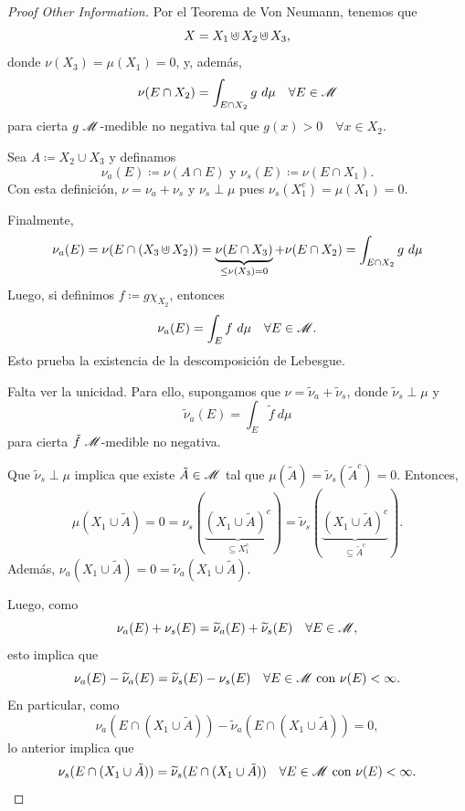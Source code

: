 
\begin{proof}[Proof Other Information]
	Por el Teorema de Von Neumann, tenemos que 
	\[ X = X_{1} \cupd X_{2} \cupd X_{3}, \]
	donde $\nu(X_{3}) = \mu(X_{1}) = 0$, y, además, 
	\[ \nu(E \cap X_{2}) = \int_{E \cap X_{2}} g \ d\mu \quad \forall E \in \mathscr{M} \]
	para cierta $g \ \mathscr{M}$-medible no negativa tal que $g(x) > 0 \quad \forall x \in X_{2}$. \par
	Sea $A \coloneq X_{2} \cup X_{3}$ y definamos
	\[ \nu_{a}(E) \coloneq \nu(A \cap E) \text{ y } \nu_{s}(E) \coloneq \nu(E \cap X_{1}). \]
	Con esta definición, $\nu = \nu_{a} + \nu_{s}$ y $\nu_{s} \perp \mu$ pues $\nu_{s}(X_{1}^{c}) = \mu(X_{1}) = 0$. \par
	Finalmente,
	\[ \nu_{a}(E) = \nu(E \cap (X_{3} \cupd X_{2})) = \underbrace{\nu(E \cap X_{3})}_{\leq \nu(X_{3}) = 0} + \nu(E \cap X_{2}) = \int_{E \cap X_{2}} g \ d\mu \]
	Luego, si definimos $f \coloneq g \chi_{X_{2}}$, entonces
	\[ \nu_{a}(E) = \int_{E} f \ d\mu \quad \forall E \in \mathscr{M}. \]
	Esto prueba la existencia de la descomposición de Lebesgue. \par
	Falta ver la unicidad. Para ello, supongamos que $\nu = \widetilde{\nu}_{a} + \widetilde{\nu}_{s}$, donde $\widetilde{\nu}_{s} \perp \mu$ y 
	\[ \widetilde{\nu}_{a}(E) = \int_{E} \widetilde{f} \ d\mu \]
	para cierta $\tilde{f} \ \mscr{M}$-medible no negativa. \par
	Que $\widetilde{\nu}_{s} \perp \mu$ implica que existe $\tilde{A} \in \mathscr{M}$ tal que $\mu(\tilde{A}) = \widetilde{\nu}_{s}(\tilde{A}^{c}) = 0$. Entonces,
	\[ \mu(X_{1} \cup \tilde{A}) = 0 = \nu_{s}(\underbrace{(X_{1} \cup \tilde{A})^{c}}_{\subseteq X_{1}^{c}}) = \widetilde{\nu}_{s}(\underbrace{(X_{1} \cup \tilde{A})^{c}}_{\subseteq \tilde{A}^{c}}). \tag{$*$} \]
	Además, $\nu_{a}(X_{1} \cup \tilde{A}) = 0 = \widetilde{\nu}_{a}(X_{1} \cup \tilde{A})$. \par
	Luego, como
	\[ \nu_{a}(E) + \nu_{s}(E) = \widetilde{\nu}_{a}(E) + \widetilde{\nu}_{s}(E) \quad \forall E \in \mathscr{M}, \]
	esto implica que
	\[ \nu_{a}(E) - \widetilde{\nu}_{a}(E) = \widetilde{\nu}_{s}(E) - \nu_{s}(E) \quad \forall E \in \mathscr{M} \text{ con } \nu(E) < \infty. \]
	En particular, como 
	\[ \nu_{a}(E \cap (X_{1} \cup \tilde{A})) - \widetilde{\nu}_{a}(E \cap (X_{1} \cup \tilde{A})) = 0, \]
	lo anterior implica que
	\[ \nu_{s}(E \cap (X_{1} \cup \tilde{A})) = \widetilde{\nu}_{s}(E \cap (X_{1} \cup \tilde{A})) \quad \forall E \in \mathscr{M} \text{ con } \nu(E) < \infty. \]

\end{proof}
